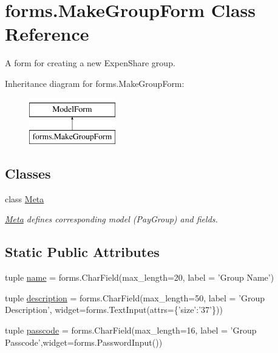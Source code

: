 \hypertarget{classforms_1_1_make_group_form}{\section{forms.\-Make\-Group\-Form Class Reference}
\label{classforms_1_1_make_group_form}
}


A form for creating a new Expen\-Share group.  


Inheritance diagram for forms.\-Make\-Group\-Form\-:\begin{figure}[H]
\begin{center}
\leavevmode
\includegraphics[height=2.000000cm]{classforms_1_1_make_group_form}
\end{center}
\end{figure}
\subsection*{Classes}
\begin{DoxyCompactItemize}
\item 
class \hyperlink{classforms_1_1_make_group_form_1_1_meta}{Meta}
\begin{DoxyCompactList}\small\item\em \hyperlink{classforms_1_1_make_group_form_1_1_meta}{Meta} defines corresponding model (Pay\-Group) and fields. \end{DoxyCompactList}\end{DoxyCompactItemize}
\subsection*{Static Public Attributes}
\begin{DoxyCompactItemize}
\item 
tuple \hyperlink{classforms_1_1_make_group_form_a4d1a913bfafa1caf65dc8b658d94f2e3}{name} = forms.\-Char\-Field(max\-\_\-length=20, label = 'Group Name')
\item 
tuple \hyperlink{classforms_1_1_make_group_form_ad2aa4425d86ae17e396cd0dd26aead15}{description} = forms.\-Char\-Field(max\-\_\-length=50, label = 'Group Description', widget=forms.\-Text\-Input(attrs=\{'size'\-:'37'\}))
\item 
tuple \hyperlink{classforms_1_1_make_group_form_a918fb02b6cb1b6e39e538ee27b42d155}{passcode} = forms.\-Char\-Field(max\-\_\-length=16, label = 'Group Passcode',widget=forms.\-Password\-Input())
\end{DoxyCompactItemize}


